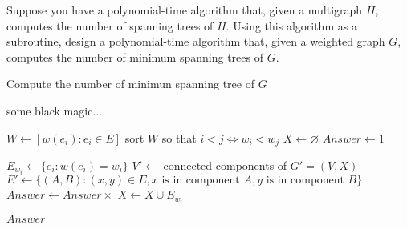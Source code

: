 



\begin{thm}{}{}
    Suppose you have a polynomial-time algorithm that, given a multigraph $H$, computes the number of spanning trees of $H$. Using this algorithm as a subroutine, design a polynomial-time algorithm that, given a weighted graph $G$, computes the number of minimum spanning trees of $G$.
\end{thm}

\begin{algorithm}
    \caption{Compute the number of minimun spanning tree of $G$}
    \begin{algorithmic}

            some black magic...

        \EndFunction


            \State $W \gets [w(e_i): e_i \in E]$
            \State sort $W$ so that $i < j \iff w_i < w_j$
            \State $X \gets \varnothing$
            \State $Answer \gets 1$


                \State $E_{w_i} \gets \{e_i: w(e_i) = w_i\} $
                \State $V' \gets$ connected components of $G' = (V, X)$
                \State $E' \gets \{(A, B): (x, y) \in E, x \text{ is in component } A, y \text{ is in component } B\}$
                \State $Answer \gets Answer \times$ 
                \State $X \gets X \cup E_{w_i}$

            \EndFor

            \Return $Answer$

        \EndFunction
    \end{algorithmic}

\end{algorithm}

